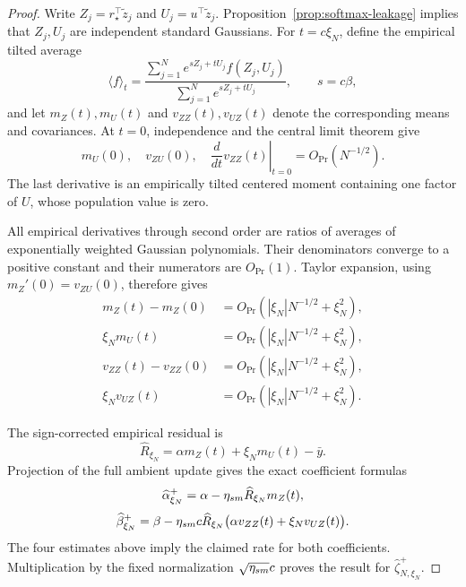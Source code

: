 \documentclass[10pt,a4paper]{amsart}
\begin{document}
\begin{proof}
Write \(Z_j=r_\star^\top\widetilde z_j\) and
\(U_j=u^\top\widetilde z_j\).  Proposition~\ref{prop:softmax-leakage}
implies that \(Z_j,U_j\) are independent standard Gaussians.  For
\(t=c\xi_N\), define the empirical tilted average
\[
\langle f\rangle_t
=
\frac{\sum_{j=1}^N e^{sZ_j+tU_j}f(Z_j,U_j)}
{\sum_{j=1}^N e^{sZ_j+tU_j}},
\qquad s=c\beta,
\]
and let \(m_Z(t),m_U(t)\) and
\(v_{ZZ}(t),v_{UZ}(t)\) denote the corresponding means and covariances.
At \(t=0\), independence and the central limit theorem give
\[
m_U(0),\quad v_{ZU}(0),\quad
\left.\frac{d}{dt}v_{ZZ}(t)\right|_{t=0}
=O_{\Pr}(N^{-1/2}).
\]
The last derivative is an empirically tilted centered moment containing one
factor of \(U\), whose population value is zero.

All empirical derivatives through second order are ratios of averages of
exponentially weighted Gaussian polynomials.  Their denominators converge to
a positive constant and their numerators are \(O_{\Pr}(1)\).  Taylor
expansion, using \(m_Z'(0)=v_{ZU}(0)\), therefore gives
\begin{align*}
m_Z(t)-m_Z(0)
&=O_{\Pr}(|\xi_N|N^{-1/2}+\xi_N^2),\\
\xi_Nm_U(t)
&=O_{\Pr}(|\xi_N|N^{-1/2}+\xi_N^2),\\
v_{ZZ}(t)-v_{ZZ}(0)
&=O_{\Pr}(|\xi_N|N^{-1/2}+\xi_N^2),\\
\xi_Nv_{UZ}(t)
&=O_{\Pr}(|\xi_N|N^{-1/2}+\xi_N^2).
\end{align*}

The sign-corrected empirical residual is
\[
\widehat R_{\xi_N}
=\alpha m_Z(t)+\xi_Nm_U(t)-\bar y.
\]
Projection of the full ambient update gives the exact coefficient formulas
\[
\widehat\alpha_{\xi_N}^+
=\alpha-\eta_{\rm sm}\widehat R_{\xi_N}m_Z(t),
\]
\[
\widehat\beta_{\xi_N}^+
=\beta-\eta_{\rm sm}c\widehat R_{\xi_N}
\bigl(\alpha v_{ZZ}(t)+\xi_Nv_{UZ}(t)\bigr).
\]
The four estimates above imply the claimed rate for both coefficients.
Multiplication by the fixed normalization
\(\sqrt{\eta_{\rm sm}}c\) proves the result for
\(\widehat\zeta^+_{N,\xi_N}\).
\end{proof}
\end{document}
